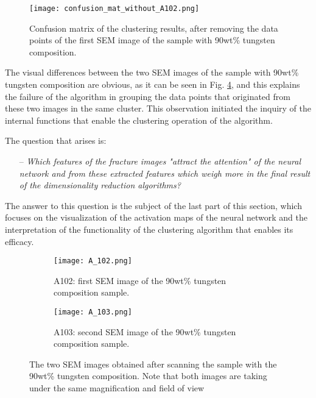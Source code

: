 \documentclass[authoryear,preprint,review,12pt, singleside]{elsarticle}
\begin{document}
\begin{figure}[!h]
	\centering
	\texttt{[image: confusion\_mat\_without\_A102.png]}
	\caption{Confusion matrix of the clustering results, after removing the data points of the first SEM image of the sample with 90wt\% tungsten composition.}
	\label{fig:confusion_mat2}
\end{figure} 

The visual differences between the two SEM images of the sample with 90wt\% tungsten composition are obvious, as it can be seen in Fig. \ref{fig:se}, and this explains the failure of the algorithm in grouping the data points that originated from these two images in the same cluster. This observation initiated the inquiry of the internal functions that enable the clustering operation of the algorithm. 

The question that arises is:

\begin{itemize}
	\item[--] \textit{Which features of the fracture images "attract the attention" of the neural network and from these extracted features which weigh more in the final result of the dimensionality reduction algorithms?}
\end{itemize}
     
The answer to this question is the subject of the last part of this section, which focuses on the visualization of the activation maps of the neural network and the interpretation of the functionality of the clustering algorithm that enables its efficacy.


\begin{figure}[!h]
	\centering
	\begin{subfigure}[b]{0.49\textwidth}
		\centering
		\texttt{[image: A\_102.png]}
		\caption{A102: first SEM image of the 90wt\% tungsten composition sample.}
		\label{fig:A_102}
	\end{subfigure}
	\begin{subfigure}[b]{0.49\textwidth}
		\centering
		\texttt{[image: A\_103.png]}
		\caption{A103: second SEM image of the 90wt\% tungsten composition sample.}
		\label{fig:A_103}
	\end{subfigure}
	\caption{The two SEM images obtained after scanning the sample with the 90wt\% tungsten composition. Note that both images are taking under the same magnification and field of view}
	\label{fig:se}
\end{figure}
\end{document}
